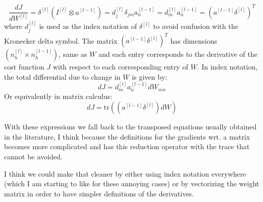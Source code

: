 \documentclass[letterpaper,12pt,oneside]{article}
\begin{document}
\begin{equation}
\frac{dJ}{dW^{[l]}} = \delta^{[l]} (I^{[l]} \otimes a^{[l-1]}) = d^{[l]}_j \delta_{jm} a_n^{[l-1]} = d^{[l]}_m a_n^{[l-1]} = (a^{[l-1]} \delta^{[l]})^T
\end{equation}
where $d^{[l]}_j$ is used as the index notation of $\delta^{[l]}$ to avoid confusion with the Kronecker delta symbol. The matrix $(a^{[l-1]} \delta^{[l]})^T$ has dimensions $(n_h^{[l]} \times n_h^{[l-1]})$, same as $W$ and each entry corresponds to the derivative of the cost function $J$ with respect to each corresponding entry of $W$.
In index notation, the total differential due to change in $W$ is given by:
\begin{equation}
dJ = d^{[l]}_m a_n^{[l-1]} dW_{mn}
\end{equation}
Or equivalently in matrix calculus:
\begin{equation}
dJ = \mathrm{tr} \left( (a^{[l-1]} \delta^{[l]}) dW \right)
\end{equation}

With these expressions we fall back to the transposed equations usually obtained in the literature, I think because the definitions for the gradients wrt. a matrix becomes more complicated and has this reduction operator with the trace that cannot be avoided.

I think we could make that cleaner by either using index notation everywhere (which I am starting to like for these annoying cases) or by vectorizing the weight matrix in order to have simpler definitions of the derivatives.
\end{document}
